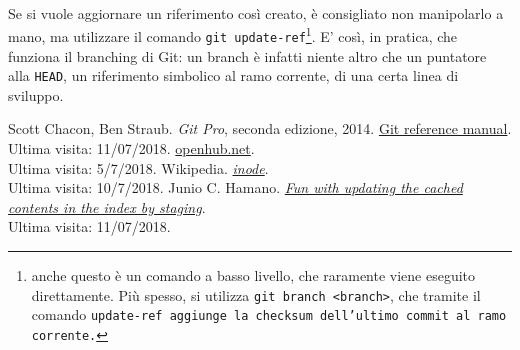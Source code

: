 \documentclass[12pt]{article}
\def\code#1{\texttt{#1}}
\begin{document}
\ \\Se si vuole aggiornare un riferimento così creato, è consigliato non manipolarlo a mano, ma utilizzare il comando \code{git update-ref}\footnote{anche questo è un comando a basso livello, che raramente viene eseguito direttamente. Più spesso, si utilizza \code{git branch <branch>}, che tramite il comando \code{update-ref aggiunge la checksum dell'ultimo commit al ramo corrente.}}. 
E' così, in pratica, che funziona il branching di Git: un branch è infatti niente altro che un puntatore alla \code{HEAD}, un riferimento simbolico al ramo corrente, di una certa linea di sviluppo. 
\newpage
\begin{thebibliography}{9}
	Scott Chacon, Ben Straub. \textit{Git Pro}, seconda edizione, 2014.
	\href{https://git-scm.com/docs}{Git reference manual}. \\Ultima visita: 11/07/2018.
	\url{openhub.net}. \\Ultima visita: 5/7/2018.
	Wikipedia. \href{https://en.wikipedia.org/wiki/Inode}{\textit{inode}}. \\Ultima visita: 10/7/2018.
	Junio C. Hamano. \href{https://gitster.livejournal.com/39629.html}{\textit{Fun with updating the cached contents in the index by staging}}. \\Ultima visita: 11/07/2018.
\end{thebibliography}
\end{document}
